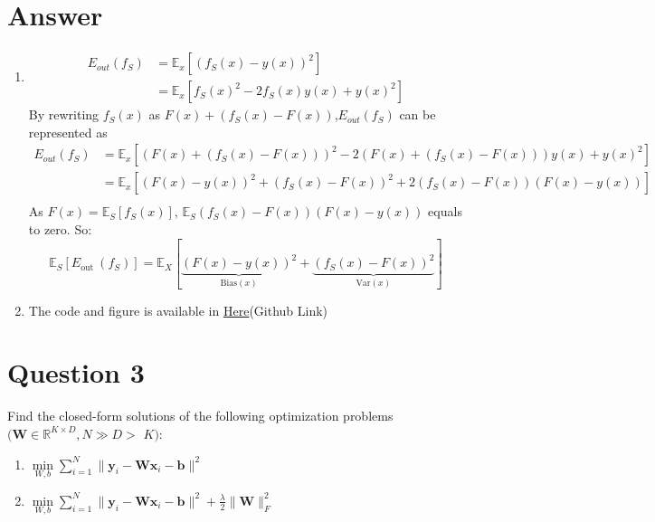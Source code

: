 \documentclass[
	12pt, %
]{fphw}
\begin{document}
\section*{Answer}
\begin{enumerate}
\item 
\begin{equation*}
	\begin{aligned}
		E_{out}(f_S) &= \mathbb{E}_x[(f_S(x)-y(x))^2] \\
		 &= \mathbb{E}_x[f_S(x)^2-2f_S(x)y(x)+y(x)^2]
	\end{aligned}
\end{equation*}
By rewriting $f_S(x)$ as $F(x)+(f_S(x)-F(x))$,$E_{out}(f_S)$ can be represented as 
\begin{equation*}
	\begin{aligned}
	E_{out}(f_S)&=\mathbb{E}_x[(F(x)+(f_S(x)-F(x)))^2-2(F(x)+(f_S(x)-F(x)))y(x)+y(x)^2] \\
	            &=\mathbb{E}_x[(F(x)-y(x))^2+(f_S(x)-F(x))^2+2(f_S(x)-F(x))(F(x)-y(x))] \\
	\end{aligned}
\end{equation*}
As $F(x)=\mathbb{E}_{S}\left[f_{S}(x)\right]$, $\mathbb{E}_{S}(f_S(x)-F(x))(F(x)-y(x))$ equals to zero. So:
\begin{equation*}
	\mathbb{E}_{S}\left[E_{\mathrm{out}}\:(f_{S})\right]=\mathbb{E}_{X}[\underbrace{(F(x)-y(x))^{2}}_{\mathrm{Bias}(x)}+\underbrace{(f_{S}(x)-F(x))^2}_{\mathrm{Var}(x)}]
\end{equation*}
\item The code and figure is available in \href{https://github.com/fanyimeng0/AIR6002/blob/main/HW1/Code/notebook_2.ipynb}{Here}(Github Link)

\end{enumerate}
\section*{Question 3}

\begin{problem}
	Find the closed-form solutions of the following optimization problems $(\mathbf{W}\in\mathbb{R}^{K\times D},N\gg D>$ $K)\colon$
	\medskip
    \begin{enumerate}
		\itemsep0.3em
		\parskip0.3em
		
	\item $\underset{W, b}{\min}\sum _{i= 1}^N\|\mathbf{y} _i- \mathbf{W} \mathbf{x} _i- \mathbf{b} \|^2$  
	\item $\underset{W, b}{\min}\sum _{i= 1}^N\|\mathbf{y} _i- \mathbf{W} \mathbf{x} _i- \mathbf{b} \|^2+ \frac \lambda2\|\mathbf{W} \|_F^2$
\end{enumerate}
\end{problem}
\end{document}
